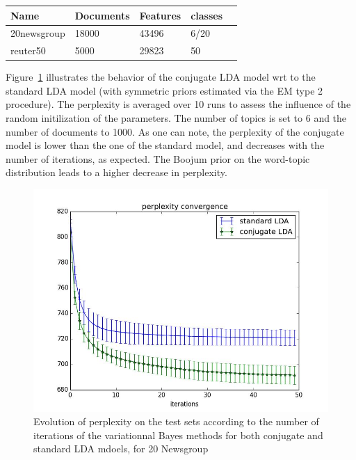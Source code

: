 \begin{center}
    \begin{tabular}{ | l | l | l | l | p{5cm} |}
        \hline
        Name & Documents & Features & classes\\ \hline
        20newsgroup & 18000 & 43496 & 6/20 \\ \hline
        reuter50 & 5000 & 29823 & 50 \\ \hline
        \hline
    \end{tabular}
\end{center}


Figure~\ref{fig:pp-exple} illustrates the behavior of the conjugate LDA model wrt to the standard LDA model (with symmetric priors estimated via the EM type 2 procedure). The perplexity is averaged over 10 runs to assess the influence of the random initilization of the parameters. The number of topics is set to 6 and the number of documents to 1000. As one can note, the perplexity of the conjugate model is lower than the one of the standard model, and decreases with the number of iterations, as expected. The Boojum prior on the word-topic distribution leads to a higher decrease in perplexity.

\begin{figure}[h]
\includegraphics[scale=0.4]{results/pp_conv}
\caption{Evolution of perplexity on the test sets according to the number of iterations of the variationnal Bayes methods for both conjugate and standard LDA mdoels, for 20 Newsgroup}
\label{fig:pp-exple}
\end{figure}



